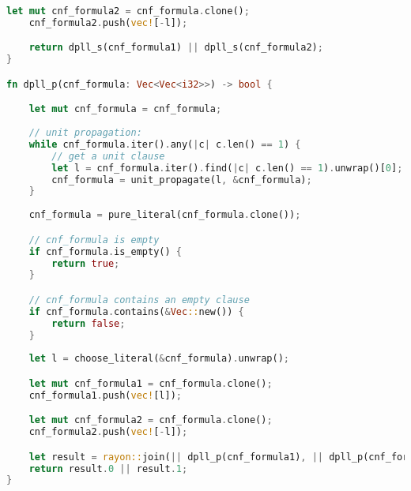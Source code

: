 \documentclass[hidelinks, conference]{IEEEtran}
\begin{document}
\begin{lstlisting}[label={lst:rust},language=Rust]
    let mut cnf_formula2 = cnf_formula.clone(); 
    cnf_formula2.push(vec![-l]); 

    return dpll_s(cnf_formula1) || dpll_s(cnf_formula2);
}

fn dpll_p(cnf_formula: Vec<Vec<i32>>) -> bool {

    let mut cnf_formula = cnf_formula; 
    
    // unit propagation:
    while cnf_formula.iter().any(|c| c.len() == 1) {
        // get a unit clause
        let l = cnf_formula.iter().find(|c| c.len() == 1).unwrap()[0]; 
        cnf_formula = unit_propagate(l, &cnf_formula);
    }
    
    cnf_formula = pure_literal(cnf_formula.clone());

    // cnf_formula is empty
    if cnf_formula.is_empty() {
        return true;
    }

    // cnf_formula contains an empty clause
    if cnf_formula.contains(&Vec::new()) {
        return false;
    }
    
    let l = choose_literal(&cnf_formula).unwrap(); 

    let mut cnf_formula1 = cnf_formula.clone(); 
    cnf_formula1.push(vec![l]);

    let mut cnf_formula2 = cnf_formula.clone(); 
    cnf_formula2.push(vec![-l]); 

    let result = rayon::join(|| dpll_p(cnf_formula1), || dpll_p(cnf_formula2));
    return result.0 || result.1;
}
\end{lstlisting}
\end{document}
